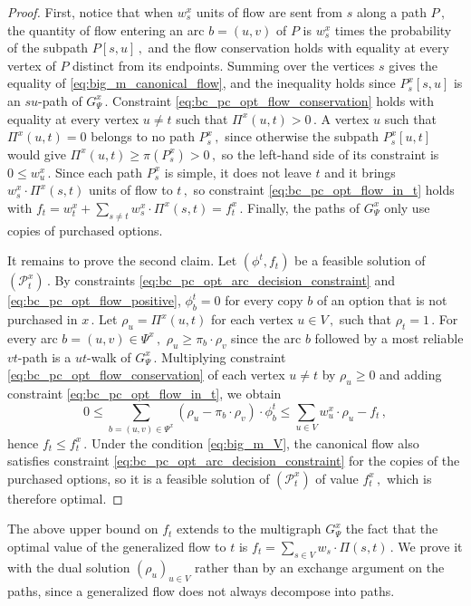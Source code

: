 \documentclass[11pt,a4paper]{report}
\theoremstyle{definition}
\theoremstyle{remark}
\begin{document}
\begin{proof}
  First, notice that when $w^x_s$ units of flow are sent from $s$ along a path $P\,,$ the quantity of flow entering an arc $b = (u,v)$ of $P$ is $w^x_s$ times the probability of the subpath $P[s,u]\,,$ and the flow conservation holds with equality at every vertex of $P$ distinct from its endpoints. Summing over the vertices $s$ gives the equality of \eqref{eq:big_m_canonical_flow}, and the inequality holds since $P^x_s[s,u]$ is an $su$-path of $G^x_\Psi\,.$ Constraint \eqref{eq:bc_pc_opt_flow_conservation} holds with equality at every vertex $u \neq t$ such that $\Pi^x(u,t) > 0\,.$ A vertex $u$ such that $\Pi^x(u,t) = 0$ belongs to no path $P^x_s\,,$ since otherwise the subpath $P^x_s[u,t]$ would give $\Pi^x(u,t) \geq \pi(P^x_s) > 0\,,$ so the left-hand side of its constraint is $0 \leq w^x_u\,.$ Since each path $P^x_s$ is simple, it does not leave $t$ and it brings $w^x_s \cdot \Pi^x(s,t)$ units of flow to $t\,,$ so constraint \eqref{eq:bc_pc_opt_flow_in_t} holds with $f_t = w^x_t + \sum_{s \neq t} w^x_s \cdot \Pi^x(s,t) = f^x_t\,.$ Finally, the paths of $G^x_\Psi$ only use copies of purchased options.

  It remains to prove the second claim. Let $(\phi^t, f_t)$ be a feasible solution of $(\mathcal{P}^x_t)\,.$ By constraints \eqref{eq:bc_pc_opt_arc_decision_constraint} and \eqref{eq:bc_pc_opt_flow_positive}, $\phi^t_b = 0$ for every copy $b$ of an option that is not purchased in $x\,.$ Let $\rho_u = \Pi^x(u,t)$ for each vertex $u \in V\,,$ such that $\rho_t = 1\,.$ For every arc $b = (u,v) \in \Psi^x\,,$ $\rho_u \geq \pi_b \cdot \rho_v$ since the arc $b$ followed by a most reliable $vt$-path is a $ut$-walk of $G^x_\Psi\,.$ Multiplying constraint \eqref{eq:bc_pc_opt_flow_conservation} of each vertex $u \neq t$ by $\rho_u \geq 0$ and adding constraint \eqref{eq:bc_pc_opt_flow_in_t}, we obtain
  \begin{equation}
    0 \leq \sum_{b = (u,v) \in \Psi^x} \left(\rho_u - \pi_b \cdot \rho_v\right) \cdot \phi^t_b \leq \sum_{u \in V} w^x_u \cdot \rho_u - f_t\,,
  \end{equation}
  hence $f_t \leq f^x_t\,.$ Under the condition \eqref{eq:big_m_V}, the canonical flow also satisfies constraint \eqref{eq:bc_pc_opt_arc_decision_constraint} for the copies of the purchased options, so it is a feasible solution of $(\mathcal{P}^x_t)$ of value $f^x_t\,,$ which is therefore optimal.
\end{proof}

The above upper bound on $f_t$ extends to the multigraph $G^x_\Psi$ the fact that the optimal value of the generalized flow to $t$ is $f_t = \sum_{s \in V} w_s \cdot \Pi(s,t)\,.$ We prove it with the dual solution $(\rho_u)_{u \in V}$ rather than by an exchange argument on the paths, since a generalized flow does not always decompose into paths.
\end{document}
